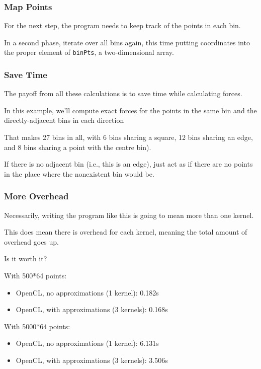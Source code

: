 \begin{frame}
\frametitle{Map Points}

For the next step, the program needs to keep track of the points in
each bin. 

 In a second phase,
iterate over all bins again, this time putting coordinates into the
proper element of {\tt binPts}, a two-dimensional array.

\end{frame}

\begin{frame}
\frametitle{Save Time}

The payoff from all these calculations is to save time while calculating forces. 

In this example, we'll compute exact forces for the points in the same bin and the directly-adjacent bins in each direction

That makes 27 bins in all, with 6 bins sharing a square, 12 bins sharing an edge, and 8 bins sharing a point with the centre bin). 

If there is no adjacent bin 
(i.e., this is an edge), just act as if there are no points 
in the place where the nonexistent bin would be. 

\end{frame}


\begin{frame}
\frametitle{More Overhead}

Necessarily, writing the program like this is going to mean more than one kernel.

This does mean there is overhead for each kernel, meaning the total amount of overhead goes up. 

Is it worth it? 

With 500*64 points:
\begin{itemize}
\item    OpenCL, no approximations (1 kernel): 0.182s
\item    OpenCL, with approximations (3 kernels): 0.168s
\end{itemize}

With 5000*64 points:
\begin{itemize}
\item    OpenCL, no approximations (1 kernel): 6.131s
\item    OpenCL, with approximations (3 kernels): 3.506s
\end{itemize}


\end{frame}





